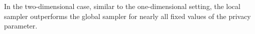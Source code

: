 \documentclass[accepted]{article}
\theoremstyle{plain} %
\theoremstyle{definition}
\theoremstyle{remark}
\newcommand{\eps}{\varepsilon}
\begin{document}
In the two-dimensional case, similar to the one-dimensional setting, the local sampler outperforms the global sampler for nearly all fixed values of the privacy parameter.









\end{document}
